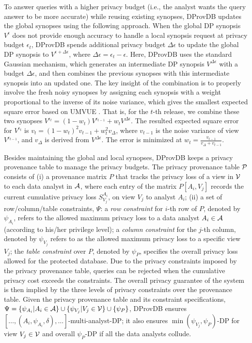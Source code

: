 To answer queries with a higher privacy budget (i.e., the analyst wants the query answer to be more accurate) while reusing existing synopses, DProvDB updates the global synopses using the following approach.
When the global DP synopsis $V^{\epsilon}$ does not provide enough accuracy to handle a local synopsis request at privacy budget $\epsilon_t$, DProvDB spends additional privacy budget $\Delta\epsilon$ to update the global DP synopsis to 
$V^{\epsilon+\Delta\epsilon}$, where $\Delta\epsilon=\epsilon_t -\epsilon$. 
Here, DProvDB uses the standard Gaussian mechanism, which generates an intermediate DP synopsis $V^{\Delta\epsilon}$ with a budget $\Delta\epsilon$, and then combines the previous synopses with this intermediate synopsis into an updated one.
The key insight of the combination is to properly involve the fresh noisy synopses by assigning each synopsis
with a weight proportional to the inverse of its noise variance, which gives the smallest expected square error based on UMVUE \cite{kiefer1952minimum,rao1949sufficient}.
That is, for the $t$-th release, we combine these two synopses $    V^{\epsilon_t} = (1-w_t) V^{\epsilon_{t-1}} + w_t V^{\Delta\epsilon}$.
The resulted expected square error for $V^{\epsilon_t}$ is $v_t=(1-w_t)^2 v_{t-1} + w_t^2 v_\Delta$, where $v_{t-1}$ is the noise variance of view $V^{\epsilon_{t-1}}$, and
$v_\Delta$ is derived from $V^{\Delta\epsilon}$.  The error is minimized at $w_t=\frac{v_{t-1}}{v_\Delta + v_{t-1}}$.



 Besides maintaining the global and local synopses, DProvDB keeps a privacy provenance table to manage the privacy budgets. 
The privacy provenance table $\mathcal{P}$ consists of (i) a provenance matrix $P$ that tracks the privacy loss of a view in $\mathcal{V}$ to each data analyst in $\mathcal{A}$, where each entry of the matrix $P[A_i, V_j]$
records the current cumulative privacy loss $S^{A_i}_{V_j}$, on view $V_j$ to analyst $A_i$;
(ii) a set of row/column/table constraints, $\Psi$:
a \emph{row constraint} for $i$-th row of $P$, denoted by $\psi_{A_i}$, refers to the allowed maximum privacy loss to a data analyst $A_i\in \mathcal{A}$ (according to his/her privilege level); a \emph{column constraint} for the $j$-th column, denoted by $\psi_{V_j}$ refers to as the allowed maximum privacy loss to a specific view $V_j$; the \emph{table constraint} over $P$, denoted by $\psi_P$, specifies the overall privacy loss allowed for the protected database.
Due to the privacy constraints imposed by the privacy provenance table, queries can be rejected when the cumulative privacy cost exceeds the constraints. The overall privacy guarantee of the system is then implied by the three levels of privacy constraints over the provenance table.
Given the privacy provenance table and its constraint specifications,   
$\Psi=\{\psi_{A_i}|A_i\in \mathcal{A}\}\cup \{\psi_{V_j}|V_j\in \mathcal{V} \}\cup \{\psi_P \}$, DProvDB ensures $[\ldots, (A_i, \psi_{A_i},\delta),\ldots]$-multi-analyst-DP; it also ensures $\min (\psi_{V_j}, \psi_P)$-DP for view $V_j\in \mathcal{V}$ and overall $\psi_P$-DP if all the data analysts collude.


